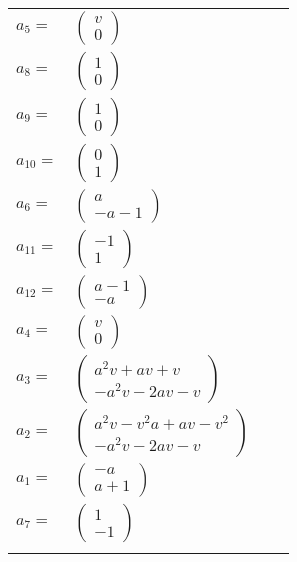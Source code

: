 \documentclass[1p]{elsarticle_modified}
\theoremstyle{definition}
\begin{document}
\begin{tabular}{m{7pt} m{180pt} m{7pt} m{180pt} }
\flushright $a_{5}=$&$\begin{pmatrix}v\\0\end{pmatrix}$ \\
\flushright $a_{8}=$&$\begin{pmatrix}1\\0\end{pmatrix}$ \\
\flushright $a_{9}=$&$\begin{pmatrix}1\\0\end{pmatrix}$ \\
\flushright $a_{10}=$&$\begin{pmatrix}0\\1\end{pmatrix}$ \\
\flushright $a_{6}=$&$\begin{pmatrix}a\\- a-1\end{pmatrix}$ \\
\flushright $a_{11}=$&$\begin{pmatrix}-1\\1\end{pmatrix}$ \\
\flushright $a_{12}=$&$\begin{pmatrix}a-1\\- a\end{pmatrix}$ \\
\flushright $a_{4}=$&$\begin{pmatrix}v\\0\end{pmatrix}$ \\
\flushright $a_{3}=$&$\begin{pmatrix}a^2 v+a v+v\\- a^2 v-2 a v- v\end{pmatrix}$ \\
\flushright $a_{2}=$&$\begin{pmatrix}a^2 v- v^2 a+a v- v^2\\- a^2 v-2 a v- v\end{pmatrix}$ \\
\flushright $a_{1}=$&$\begin{pmatrix}- a\\a+1\end{pmatrix}$ \\
\flushright $a_{7}=$&$\begin{pmatrix}1\\-1\end{pmatrix}$\\&\end{tabular}
\end{document}
